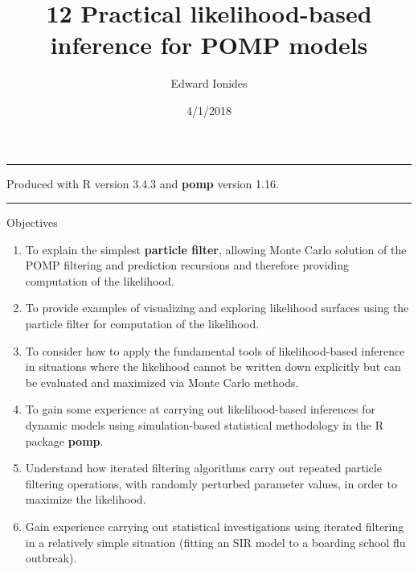 \documentclass[]{article}
\title{12 Practical likelihood-based inference for POMP models}
\author{Edward Ionides}
\date{4/1/2018}
\begin{document}
\maketitle

{
\setcounter{tocdepth}{2}
\tableofcontents
}
\newcommand\prob{\mathbb{P}}
\newcommand\E{\mathbb{E}}
\newcommand\cov{\mathrm{Cov}}
\newcommand\loglik{\ell}
\newcommand\R{\mathbb{R}}
\newcommand\data[1]{#1^*}
\newcommand\params{\, ; \,}
\newcommand\transpose{\scriptsize{T}}
\newcommand\eqspace{\quad\quad}
\newcommand\myeq[1]{\eqspace \displaystyle #1}
\newcommand\lik{\mathcal{L}}
\newcommand\profileloglik[1]{\ell^\mathrm{profile}_#1}
\newcommand\ar{\phi}
\newcommand\ma{\psi}
\newcommand\AR{\Phi}
\newcommand\MA{\Psi}
\newcommand\ev{u}
\newcommand\given{{\, | \,}}
\newcommand\equals{{=\,}}
\newcommand\matA{\mathbb{A}}
\newcommand\matB{\mathbb{B}}
\newcommand\matH{\mathbb{H}}
\newcommand\covmatX{\mathbb{U}}
\newcommand\covmatY{\mathbb{V}}

\newcommand\expect[1]{\mathbb{E}\left[{#1}\right]}
\newcommand\var[1]{\mathrm{Var}\left[{#1}\right]}
\newcommand\dist[2]{\mathrm{#1}\left(#2\right)}
\newcommand\dlta{\Delta}

\begin{center}\rule{0.5\linewidth}{\linethickness}\end{center}

Produced with R version 3.4.3 and \textbf{pomp} version 1.16.

\begin{center}\rule{0.5\linewidth}{\linethickness}\end{center}

Objectives

\begin{enumerate}
\def\labelenumi{\arabic{enumi}.}
\item
  To explain the simplest \textbf{particle filter}, allowing Monte Carlo
  solution of the POMP filtering and prediction recursions and therefore
  providing computation of the likelihood.
\item
  To provide examples of visualizing and exploring likelihood surfaces
  using the particle filter for computation of the likelihood.
\item
  To consider how to apply the fundamental tools of likelihood-based
  inference in situations where the likelihood cannot be written down
  explicitly but can be evaluated and maximized via Monte Carlo methods.
\item
  To gain some experience at carrying out likelihood-based inferences
  for dynamic models using simulation-based statistical methodology in
  the R package \textbf{pomp}.
\item
  Understand how iterated filtering algorithms carry out repeated
  particle filtering operations, with randomly perturbed parameter
  values, in order to maximize the likelihood.
\item
  Gain experience carrying out statistical investigations using iterated
  filtering in a relatively simple situation (fitting an SIR model to a
  boarding school flu outbreak).
\end{enumerate}
\end{document}
